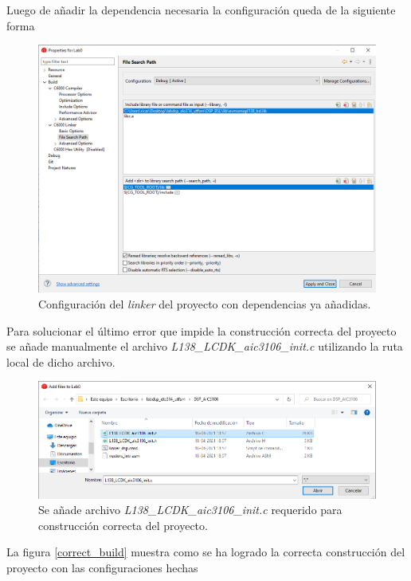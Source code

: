 \begin{enumerate}
    
    Luego de añadir la dependencia necesaria la configuración queda de la siguiente forma
    
    \begin{figure}[H]
        \centering
        \includegraphics[scale = 0.5]{figures/linker_local.png}
        \caption{Configuración del \textit{linker} del proyecto con dependencias ya añadidas.}
        \label{fig:my_label}
    \end{figure}
    
    
    
    Para solucionar el último error que impide la construcción correcta del proyecto se añade manualmente el archivo \textit{L138\_LCDK\_aic3106\_init.c} utilizando la ruta local de dicho archivo.
    
    
    \begin{figure}[H]
        \centering
        \includegraphics[scale = 0.5]{figures/aic3106.png}
        \caption{Se añade archivo \textit{L138\_LCDK\_aic3106\_init.c} requerido para construcción correcta del proyecto.}
        \label{fig:my_label}
    \end{figure}
    
    
    La figura \ref{correct_build} muestra como se ha logrado la correcta construcción del proyecto con las configuraciones hechas
    

\end{enumerate}
